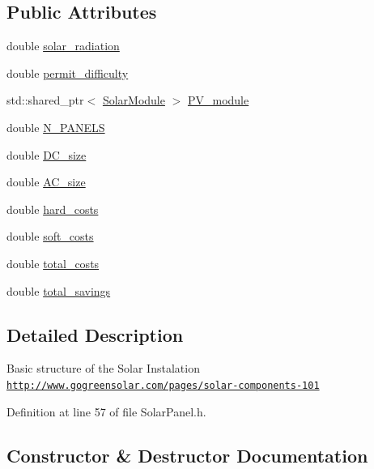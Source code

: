 \subsection*{Public Attributes}
\begin{DoxyCompactItemize}
\item 
double \hyperlink{classsolar__core_1_1_p_v_design_a1a20c72743528802ed5498fe848559df}{solar\+\_\+radiation}
\item 
double \hyperlink{classsolar__core_1_1_p_v_design_a8c2897033c697a6dcfb96787358dc64f}{permit\+\_\+difficulty}
\item 
std\+::shared\+\_\+ptr$<$ \hyperlink{classsolar__core_1_1_solar_module}{Solar\+Module} $>$ \hyperlink{classsolar__core_1_1_p_v_design_a89f2b59847de64cab26b56f21ace4e6c}{P\+V\+\_\+module}
\item 
double \hyperlink{classsolar__core_1_1_p_v_design_abef277ad010afb4ab6c6c13113a8c017}{N\+\_\+\+P\+A\+N\+E\+L\+S}
\item 
double \hyperlink{classsolar__core_1_1_p_v_design_a21148518ef58004be10b91dc75fdd5b5}{D\+C\+\_\+size}
\item 
double \hyperlink{classsolar__core_1_1_p_v_design_a79a70e7fe3adcbc4e9256db9df38e444}{A\+C\+\_\+size}
\item 
double \hyperlink{classsolar__core_1_1_p_v_design_a18cec349cd8f04efcb67562e30416860}{hard\+\_\+costs}
\item 
double \hyperlink{classsolar__core_1_1_p_v_design_ac1220011d65d7cc442cd143f93123f31}{soft\+\_\+costs}
\item 
double \hyperlink{classsolar__core_1_1_p_v_design_ac015f1cf090279e45861f2860f008cc2}{total\+\_\+costs}
\item 
double \hyperlink{classsolar__core_1_1_p_v_design_a7628fe2e1ea95f8df79aca11dd5a356d}{total\+\_\+savings}
\end{DoxyCompactItemize}


\subsection{Detailed Description}
Basic structure of the Solar Instalation \href{http://www.gogreensolar.com/pages/solar-components-101}{\tt http\+://www.\+gogreensolar.\+com/pages/solar-\/components-\/101} 

Definition at line 57 of file Solar\+Panel.\+h.



\subsection{Constructor \& Destructor Documentation}
\hypertarget{classsolar__core_1_1_p_v_design_a81f17c9ff8bba733daf22c578efa3e20}{}
